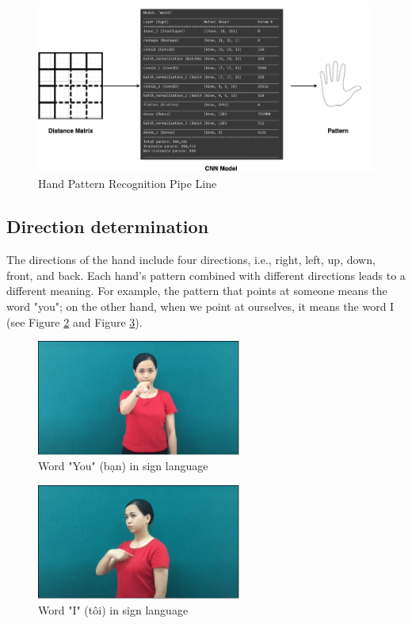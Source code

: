 \begin{figure}[H]
	\centering
	\includegraphics[width=\textwidth]{img/Chap4/Hand-Pattern-Reg-Model.png}
	\caption{Hand Pattern Recognition Pipe Line}
	\label{fig:Chap4-StructureOfConvolutionalNeuralNetwork}
\end{figure}

\subsection{Direction determination}

The directions of the hand include four directions, i.e., right, left, up, down, front, and back. Each hand's pattern combined with different directions leads to a different meaning. For example, the pattern that points at someone means the word "you"; on the other hand, when we point at ourselves, it means the word I (see Figure \ref{fig:Chap4-WordYouInSignLanguage} and Figure \ref{fig:Chap4-WordIInSignLanguage}).

\begin{figure}[H]
	\centering
	\includegraphics[width=0.6\textwidth]{img/Chap4/WordYouInSignLanguage.png}
	\caption{Word "You" (bạn) in sign language}
	\label{fig:Chap4-WordYouInSignLanguage}
\end{figure}

\begin{figure}[H]
	\centering
	\includegraphics[width=0.6\textwidth]{img/Chap4/WordIInSignLanguage.png}
	\caption{Word "I" (tôi) in sign language}
	\label{fig:Chap4-WordIInSignLanguage}
\end{figure}


